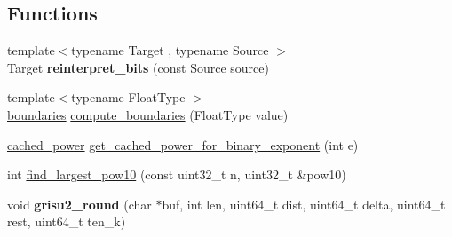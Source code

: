 \subsection*{Functions}
\begin{DoxyCompactItemize}
\item 
{\footnotesize template$<$typename Target , typename Source $>$ }\\Target {\bfseries reinterpret\+\_\+bits} (const Source source)\hypertarget{namespacenlohmann_1_1detail_1_1dtoa__impl_a1c5d30eb51e5e994a3f48bde104d2ce8}{}\label{namespacenlohmann_1_1detail_1_1dtoa__impl_a1c5d30eb51e5e994a3f48bde104d2ce8}

\item 
{\footnotesize template$<$typename Float\+Type $>$ }\\\hyperlink{structnlohmann_1_1detail_1_1dtoa__impl_1_1boundaries}{boundaries} \hyperlink{namespacenlohmann_1_1detail_1_1dtoa__impl_a22b6e37654ac93c6d0d9c06ec1bf5ded}{compute\+\_\+boundaries} (Float\+Type value)
\item 
\hyperlink{structnlohmann_1_1detail_1_1dtoa__impl_1_1cached__power}{cached\+\_\+power} \hyperlink{namespacenlohmann_1_1detail_1_1dtoa__impl_adbf329a18c5cf854a3477327afd2200b}{get\+\_\+cached\+\_\+power\+\_\+for\+\_\+binary\+\_\+exponent} (int e)
\item 
int \hyperlink{namespacenlohmann_1_1detail_1_1dtoa__impl_a264df2b5a7e19b864859161f3501155e}{find\+\_\+largest\+\_\+pow10} (const uint32\+\_\+t n, uint32\+\_\+t \&pow10)
\item 
void {\bfseries grisu2\+\_\+round} (char $\ast$buf, int len, uint64\+\_\+t dist, uint64\+\_\+t delta, uint64\+\_\+t rest, uint64\+\_\+t ten\+\_\+k)\hypertarget{namespacenlohmann_1_1detail_1_1dtoa__impl_a9e66e6d0f072aa4fc0627bffc5b1cbd8}{}\label{namespacenlohmann_1_1detail_1_1dtoa__impl_a9e66e6d0f072aa4fc0627bffc5b1cbd8}


\end{DoxyCompactItemize}
